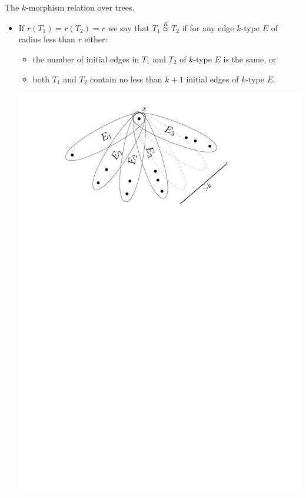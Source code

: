 \documentclass[handout, 11pt]{beamer}
\newcommand{\morph}[1]{\stackrel{#1}{\simeq}}
\begin{document}
	\begin{frame}{The $k$-morphism relation over trees.}
		\begin{itemize}
		\item If $r(T_1)=r(T_2)=r$ we say that $T_1\morph{K}T_2$ if
		for any edge $k$-type $E$ of radius less than $r$ either:
		\begin{itemize}
			\vspace{0.2 em}
			\item the number of initial edges in $T_1$ and $T_2$ of $k$-type $E$ 
			is the same, or
			\vspace{0.2 em}
			\item both $T_1$ and $T_2$ contain no less than $k+1$
			initial edges of $k$-type $E$. 
		\end{itemize}
		\begin{center}
			\includegraphics[width=0.7\linewidth]{Try.pdf}
		\end{center}
			
		\end{itemize}
	
		
	\end{frame}
\end{document}
